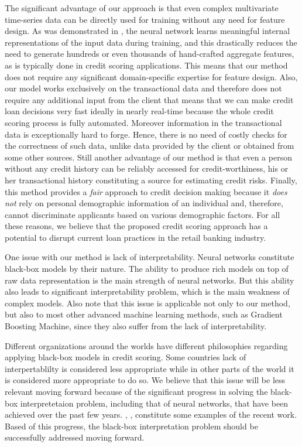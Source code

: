 \documentclass[sigconf]{acmart}
\begin{document}
The significant advantage of our approach is that even complex multivariate time-series data can be directly used for training without any need for feature design. As was demonstrated in \cite{erhan2009visualizing}, the neural network learns meaningful internal representations of the input data during training, and this drastically reduces the need to generate hundreds or even thousands of hand-crafted aggregate features, as is typically done in credit scoring applications. This means that our method does not require any significant domain-specific expertise for feature design.
Also, our model works exclusively on the transactional data and therefore does not require any additional input from the client that means that we can make credit loan decisions very fast ideally in nearly real-time because the whole credit scoring process is fully automated.
Moreover information in the transactional data is exceptionally hard to forge. Hence, there is no need of costly checks for the correctness of such data, unlike data provided by the client or obtained from some other sources.
Still another advantage of our method is that even a person without any credit history can be reliably accessed for credit-worthiness, his or her transactional history constituting a source for estimating credit risks.
Finally, this method provides a \textit{fair} approach to credit decision making because it \textit{does not} rely on personal demographic information of an individual and, therefore, cannot discriminate applicants based on various demographic factors.
For all these reasons, we believe that the proposed credit scoring approach has a potential to disrupt current loan practices in the retail banking industry.

One issue with our method is lack of interpretability. Neural networks constitute black-box models by their nature. The ability to produce rich models on top of raw data representation is the main strength of neural networks. But this ability also leads to significant interpretability problem, which is the main weakness of complex models. Also note that this issue is applicable not only to our method, but also to most other advanced machine learning methods, such as  Gradient Boosting Machine, since they also suffer from the lack of interpretability.

Different organizations around the worlds have different philosophies regarding applying black-box models in credit scoring. Some countries lack of interpertablilty is considered less appropriate while in other parts of the world it is considered more appropriate to do so. We believe that this issue will be less relevant moving forward because of the significant progress in solving the black-box interpretetaion problem, including that of neural networks, that have been achieved over the past few years. \cite{DBLP:journals/corr/ChoiBSSS16}, \cite{gupta2018lisa}, \cite{mccoy2018rnns} constitute some examples of the recent work. Based of this progress, the black-box interpretation problem should be successfully addressed moving forward.
\end{document}
